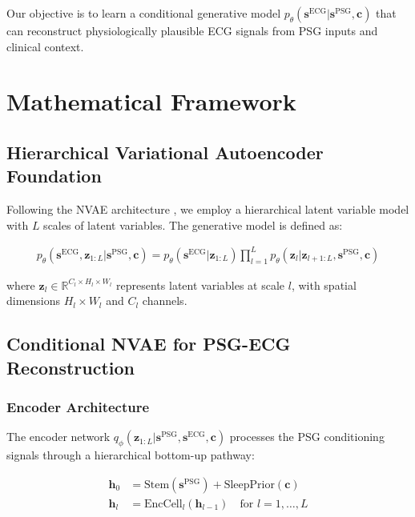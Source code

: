 \documentclass[11pt]{article}
\begin{document}
Our objective is to learn a conditional generative model $p_\theta(\mathbf{s}^{\text{ECG}} | \mathbf{s}^{\text{PSG}}, \mathbf{c})$ that can reconstruct physiologically plausible ECG signals from PSG inputs and clinical context.

\section{Mathematical Framework}

\subsection{Hierarchical Variational Autoencoder Foundation}

Following the NVAE architecture \cite{vahdat2020nvae}, we employ a hierarchical latent variable model with $L$ scales of latent variables. The generative model is defined as:

\begin{align}
p_\theta(\mathbf{s}^{\text{ECG}}, \mathbf{z}_{1:L} | \mathbf{s}^{\text{PSG}}, \mathbf{c}) = p_\theta(\mathbf{s}^{\text{ECG}} | \mathbf{z}_{1:L}) \prod_{l=1}^{L} p_\theta(\mathbf{z}_l | \mathbf{z}_{l+1:L}, \mathbf{s}^{\text{PSG}}, \mathbf{c})
\end{align}

where $\mathbf{z}_l \in \mathbb{R}^{C_l \times H_l \times W_l}$ represents latent variables at scale $l$, with spatial dimensions $H_l \times W_l$ and $C_l$ channels.

\subsection{Conditional NVAE for PSG-ECG Reconstruction}

\subsubsection{Encoder Architecture}

The encoder network $q_\phi(\mathbf{z}_{1:L} | \mathbf{s}^{\text{PSG}}, \mathbf{s}^{\text{ECG}}, \mathbf{c})$ processes the PSG conditioning signals through a hierarchical bottom-up pathway:

\begin{align}
\mathbf{h}_0 &= \text{Stem}(\mathbf{s}^{\text{PSG}}) + \text{SleepPrior}(\mathbf{c}) \\
\mathbf{h}_{l} &= \text{EncCell}_l(\mathbf{h}_{l-1}) \quad \text{for } l = 1, \ldots, L
\end{align}
\end{document}
